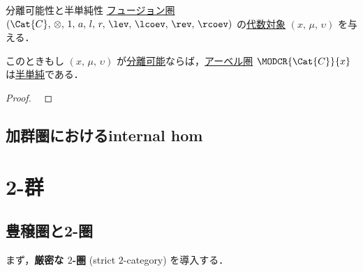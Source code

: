 \documentclass[TQFT_main]{subfiles}
\begin{document}
\begin{myprop}[label=prop:separable-alg]{分離可能性と半単純性}
    \hyperref[def:tensorfusion-cat]{フュージョン圏} $(\Cat{C},\, \otimes,\, 1,\, a,\, l,\, r,\, \lev,\, \lcoev,\, \rev,\, \rcoev)$ の\hyperref[def:algobj]{代数対象} $(x,\,\mu ,\,\upsilon)$ を与える．

    このときもし $(x,\, \mu,\, \upsilon)$ が\hyperref[def:separable-alg]{分離可能}ならば，\hyperref[def:additive-cat]{アーベル圏} $\MODCR{\Cat{C}}{x}$ は\hyperref[def:semisimple-cat]{半単純}である．
\end{myprop}

\begin{proof}
    ~\cite[PROPOSITION7.8.30, p.146]{etingof2015tensor}
\end{proof}

\subsection{加群圏におけるinternal hom}



\section{2-群}

\subsection{豊穣圏と2-圏}

まず，\textbf{厳密な $2$-圏} (strict $2$-category) を導入する．
\end{document}
